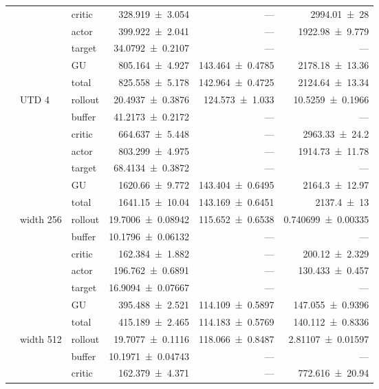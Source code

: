 {\begin{longtable}{@{}lllrrr@{}}
     &  & critic & \num{328.919+-3.054} & --- & \num{2994.01+-28} \\
     &  & actor & \num{399.922+-2.041} & --- & \num{1922.98+-9.779} \\
     &  & target & \num{34.0792+-0.2107} & --- & --- \\
     &  & GU & \num{805.164+-4.927} & \num{143.464+-0.4785} & \num{2178.18+-13.36} \\
     &  & total & \num{825.558+-5.178} & \num{142.964+-0.4725} & \num{2124.64+-13.34} \\
    \addlinespace[2pt]
     & UTD 4 & rollout & \num{20.4937+-0.3876} & \num{124.573+-1.033} & \num{10.5259+-0.1966} \\
     &  & buffer & \num{41.2173+-0.2172} & --- & --- \\
     &  & critic & \num{664.637+-5.448} & --- & \num{2963.33+-24.2} \\
     &  & actor & \num{803.299+-4.975} & --- & \num{1914.73+-11.78} \\
     &  & target & \num{68.4134+-0.3872} & --- & --- \\
     &  & GU & \num{1620.66+-9.772} & \num{143.404+-0.6495} & \num{2164.3+-12.97} \\
     &  & total & \num{1641.15+-10.04} & \num{143.169+-0.6451} & \num{2137.4+-13} \\
    \addlinespace[2pt]
     & width 256 & rollout & \num{19.7006+-0.08942} & \num{115.652+-0.6538} & \num{0.740699+-0.00335} \\
     &  & buffer & \num{10.1796+-0.06132} & --- & --- \\
     &  & critic & \num{162.384+-1.882} & --- & \num{200.12+-2.329} \\
     &  & actor & \num{196.762+-0.6891} & --- & \num{130.433+-0.457} \\
     &  & target & \num{16.9094+-0.07667} & --- & --- \\
     &  & GU & \num{395.488+-2.521} & \num{114.109+-0.5897} & \num{147.055+-0.9396} \\
     &  & total & \num{415.189+-2.465} & \num{114.183+-0.5769} & \num{140.112+-0.8336} \\
    \addlinespace[2pt]
     & width 512 & rollout & \num{19.7077+-0.1116} & \num{118.066+-0.8487} & \num{2.81107+-0.01597} \\
     &  & buffer & \num{10.1971+-0.04743} & --- & --- \\
     &  & critic & \num{162.379+-4.371} & --- & \num{772.616+-20.94} \\

\end{longtable}}
